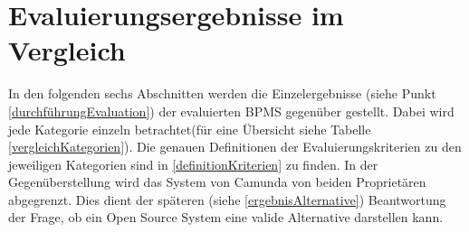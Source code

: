 \newpage
\section{Evaluierungsergebnisse im Vergleich}
\label{ergebnisKapitel}
In den folgenden sechs Abschnitten werden die Einzelergebnisse (siehe Punkt \ref{durchführungEvaluation}) der evaluierten \ac{BPMS} gegenüber gestellt. Dabei wird jede Kategorie einzeln betrachtet(für eine Übersicht siehe Tabelle \ref{vergleichKategorien}). Die genauen Definitionen der Evaluierungskriterien zu den jeweiligen Kategorien sind in \ref{definitionKriterien} zu finden. In der Gegenüberstellung wird das System von Camunda von beiden Proprietären abgegrenzt. Dies dient der späteren (siehe \ref{ergebnisAlternative}) Beantwortung der Frage, ob ein Open Source System eine valide Alternative darstellen kann.


